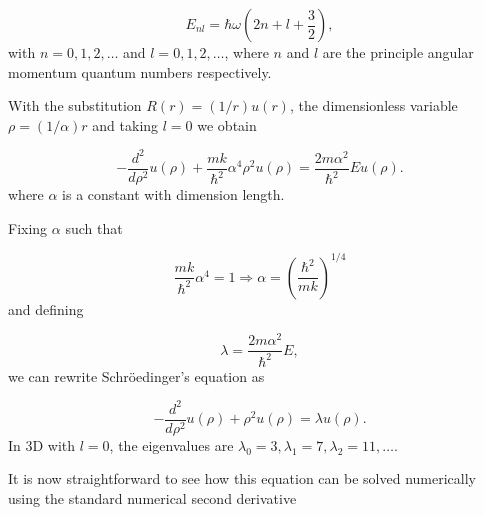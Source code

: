 \documentclass[10pt,showpacs,preprintnumbers,footinbib,amsmath,amssymb,aps,prl,twocolumn,groupedaddress,superscriptaddress,showkeys]{revtex4-1}
\begin{document}
\begin{equation}
E_{nl}=  \hbar \omega \left(2n+l+\frac{3}{2}\right),
\label{eq:enl}
\end{equation}
with $n=0,1,2,\dots$ and $l=0,1,2,\dots$, where $n$ and $l$
are the principle angular momentum quantum numbers
respectively.

With the substitution $R(r) = (1/r) u(r)$, the dimensionless variable
$\rho = (1/ \alpha) r$ and taking $l=0$ we obtain

\begin{equation*}
  -\frac{d^2}{d\rho^2} u(\rho) 
       + \frac{mk}{\hbar^2} \alpha^4\rho^2u(\rho)  = \frac{2m\alpha^2}{\hbar^2}E u(\rho) .
\end{equation*}
where $\alpha$ is a constant with dimension length.

Fixing $\alpha$ such that

\begin{equation*}
\frac{mk}{\hbar^2} \alpha^4 = 1 \Rightarrow \alpha = \left(\frac{\hbar^2}{mk}\right)^{1/4}
\end{equation*}
and defining

\begin{equation*}
\lambda = \frac{2m\alpha^2}{\hbar^2}E,
\end{equation*}
we can rewrite Schr\"{o}edinger's equation as

\begin{equation}
  -\frac{d^2}{d\rho^2} u(\rho) + \rho^2u(\rho)  = \lambda u(\rho) .
\label{eq:1bseq}
\end{equation}
In 3D with $l=0$, the eigenvalues are
$\lambda_0=3,\lambda_1=7,\lambda_2=11,\dots .$

It is now straightforward to see how this equation can be solved numerically using the standard
numerical second derivative
\end{document}
